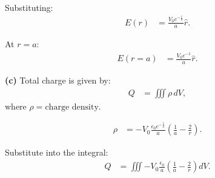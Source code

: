 \documentclass{article}
\begin{document}
Substituting:
\begin{align*}
E(r) &= \frac{V_0 e^{-\frac{r}{a}}}{a} \hat{r}.
\end{align*}

At $ r = a $:
\begin{align*}
E(r=a) &= \frac{V_0 e^{-1}}{a} \hat{r}.
\end{align*}

\textbf{(c)} Total charge is given by:
\begin{align*}
Q &= \iiint \rho \, dV,
\end{align*}
where $\rho = \text{charge density}$.

\begin{align*}
\rho &= -V_0 \frac{\epsilon_0 e^{-\frac{r}{a}}}{a} \left( \frac{1}{a} - \frac{2}{r} \right).
\end{align*}

Substitute into the integral:
\begin{align*}
Q &= \iiint -V_0 \frac{\epsilon_0}{a} \left( \frac{1}{a} - \frac{2}{r} \right) dV.
\end{align*}
\end{document}
